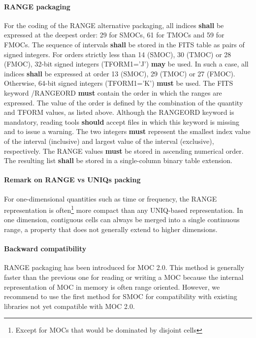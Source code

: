 \documentclass[11pt,a4paper]{ivoa}
\begin{document}
\paragraph{RANGE packaging}
For the coding of the RANGE alternative packaging, all indices {\bf shall}
be expressed at the deepest order: 29 for SMOCs, 61 for TMOCs and 59 for FMOCs.
The sequence of intervals {\bf shall} be stored in the FITS table as pairs
of signed integers.
For orders strictly less than 14 (SMOC), 30 (TMOC) or 28 (FMOC),
32-bit signed integers (TFORM1='J') {\bf may} be used.
In such a case, all indices {\bf shall} be expressed at order 13 (SMOC), 29 (TMOC) or 27 (FMOC).
Otherwise, 64-bit signed integers (TFORM1='K') {\bf must} be used.
The FITS keyword /RANGEORD {\bf must} contain the order in which the ranges are expressed.
The value of the order is defined by the combination of the quantity and TFORM values,
as listed above.
Although the RANGEORD keyword is mandatory, reading tools {\bf should} accept
files in which this keyword is missing and to issue a warning.
The two integers {\bf must} represent the smallest index value of the interval
(inclusive) and largest value of the interval (exclusive), respectively.
The RANGE values {\bf must} be stored in ascending numerical order.
The resulting list {\bf shall} be stored in a single-column binary table extension. 

\paragraph{Remark on RANGE vs UNIQs packing}

For one-dimensional quantities such as time or frequency, the RANGE representation
is often\footnote{Except for MOCs that would be dominated by disjoint cells} more compact
than any UNIQ-based representation.
In one dimension, contiguous cells can always be merged into a single continuous range, 
a property that does not generally extend to higher dimensions.

\paragraph{Backward compatibility}
RANGE packaging has been introduced for MOC 2.0.
This method is generally faster than the previous one for reading or
writing a MOC because the internal representation of MOC
in memory is often range oriented. However, we recommend to
use the first method for SMOC for compatibility with existing libraries 
not yet compatible with MOC 2.0.
\end{document}
